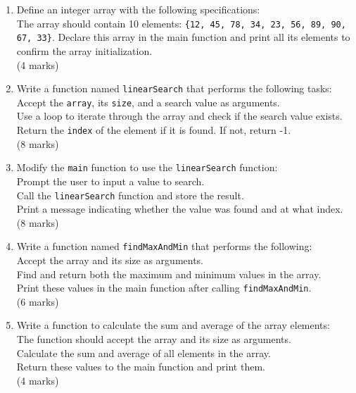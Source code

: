 \documentclass[a4paper,12pt]{article}
\begin{document}
\begin{enumerate}
    \item Define an integer array with the following specifications:\\

    The array should contain 10 elements: \verb|{12, 45, 78, 34, 23, 56, 89, 90, 67, 33}|.
    Declare this array in the main function and print all its elements to confirm the array initialization.\\

    (4 marks)\\

    \item Write a function named \verb|linearSearch| that performs the following tasks:\\

    Accept the \verb|array|, its \verb|size|, and a search value as arguments.\\
    Use a loop to iterate through the array and check if the search value exists.\\
    Return the \verb|index| of the element if it is found. If not, return -1.\\
    
    (8 marks)

    \item Modify the \verb|main| function to use the \verb|linearSearch| function:\\

    Prompt the user to input a value to search.\\
    Call the \verb|linearSearch| function and store the result.\\
    Print a message indicating whether the value was found and at what index.\\

    (8 marks)\\

    \item Write a function named \verb|findMaxAndMin| that performs the following:\\

    Accept the array and its size as arguments.\\
    Find and return both the maximum and minimum values in the array.\\
    Print these values in the main function after calling \verb|findMaxAndMin|.\\

    (6 marks)\\

    \item Write a function to calculate the sum and average of the array elements:\\

    The function should accept the array and its size as arguments.\\
    Calculate the sum and average of all elements in the array.\\
    Return these values to the main function and print them.\\

    (4 marks)\\

\end{enumerate}
\end{document}
